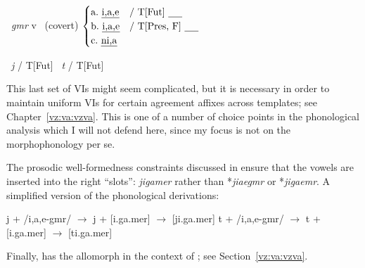 \begin{exe}
\begin{xlist}
\begin{xlist}
\begin{exe}
\begin{xlist}
\begin{xlist}
\begin{exe}
\begin{xlist}
\begin{xlist}
\begin{exe}
\begin{exe}
\begin{xlist}
\begin{exe}
\begin{exe}
\begin{xlist}
\begin{exe}
\begin{exe}
\begin{exe}
\begin{exe}
\begin{exe}
\begin{xlist}
\begin{exe}
\begin{xlist}
\begin{exe}
\begin{exe}
\begin{xlist}
\begin{exe}
\begin{xlist}
\begin{exe}
\begin{xlist}
\begin{exe}
\begin{exe}
\begin{exe}
\begin{xlist}
\begin{exe}
\begin{exe}
\begin{exe}
\begin{xlist}
\begin{exe}
\begin{xlist}
\begin{exe}
\begin{xlist}
\begin{exe}
\begin{xlist}
\begin{exe}
\begin{exe}
\begin{exe}
 \begin{exe}
\ex  {} \lra~\emph{gmr} 
\ex  v \lra~(covert) 
\ex  \label{vi:vz} {\vz} \lra $\begin{cases} 
\text{a.~\emph{i,a,e}} & \text{/ T[Fut] \trace}\\
\text{b.~\emph{i,a,e}} & \text{/ T[Pres, F] \trace}\\
\text{c.~\emph{ni,a}} & \\
\end{cases}$

 \ex  
 \begin{xlist} 
 	 \lra~\emph{j} / {\trace} T[Fut] 
 	 \lra~\emph{t} / {\trace} T[Fut] 
 \z
\z 

This last set of VIs might seem complicated, but it is necessary in order to maintain uniform VIs for certain agreement affixes across templates; see Chapter~\ref{vz:va:vzva}. This is one of a number of choice points in the phonological analysis which I will not defend here, since my focus is not on the morphophonology per se.

The prosodic well-formedness constraints discussed in \cite{kastner18nllt} ensure that the vowels are inserted into the right ``slots'': \emph{jigamer} rather than *\emph{jiaegmr} or *\emph{jigaemr}. A simplified version of the phonological derivations:
 \begin{exe}
 \ex  
 \begin{xlist} 
 	\ex  j + /i,a,e-gmr/ $\rightarrow$ j + [i.ga.mer] $\rightarrow$ [ji.ga.mer] 
 	\ex  t + /i,a,e-gmr/ $\rightarrow$ t + [i.ga.mer] $\rightarrow$ [ti.ga.mer] 
 \z
\z 

Finally, {\vz} has the allomorph {\thit} in the context of {\va}; see Section~\ref{vz:va:vzva}.



\end{xlist}
\end{exe}
\end{xlist}
\end{exe}
\end{exe}
\end{exe}
\end{exe}
\end{xlist}
\end{exe}
\end{xlist}
\end{exe}
\end{xlist}
\end{exe}
\end{xlist}
\end{exe}
\end{exe}
\end{exe}
\end{xlist}
\end{exe}
\end{exe}
\end{exe}
\end{xlist}
\end{exe}
\end{xlist}
\end{exe}
\end{xlist}
\end{exe}
\end{exe}
\end{xlist}
\end{exe}
\end{xlist}
\end{exe}
\end{exe}
\end{exe}
\end{exe}
\end{exe}
\end{xlist}
\end{exe}
\end{exe}
\end{xlist}
\end{exe}
\end{exe}
\end{xlist}
\end{xlist}
\end{exe}
\end{xlist}
\end{xlist}
\end{exe}
\end{xlist}
\end{xlist}
\end{exe}
